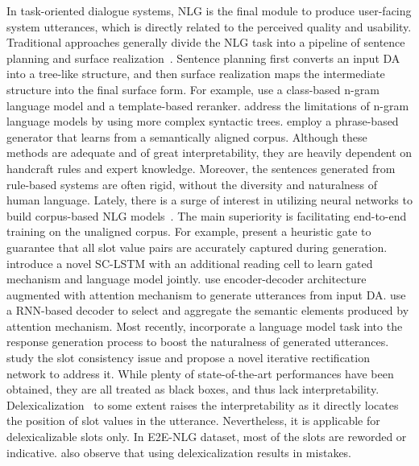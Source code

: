 \documentclass[letterpaper]{article} %
\begin{document}
In task-oriented dialogue systems, NLG is the final module to produce user-facing system utterances, which is directly related to the perceived quality and usability. Traditional approaches generally divide the NLG task into a pipeline of sentence planning and surface realization~\citep{oh2000stochastic,ratnaparkhi2000trainable,mirkovic2011dialogue,cheyer2014method}. Sentence planning first converts an input DA into a tree-like structure, and then surface realization maps the intermediate structure into the final surface form. For example, \citet{oh2000stochastic} use a class-based n-gram language model and a template-based reranker. \citet{ratnaparkhi2000trainable} address the limitations of n-gram language models by using more complex syntactic trees. \citet{mairesse2014stochastic} employ a phrase-based generator that learns from a semantically aligned corpus. Although these methods are adequate and of great interpretability, they are heavily dependent on handcraft rules and expert knowledge. Moreover, the sentences generated from rule-based systems are often rigid, without the diversity and naturalness of human language.  Lately, there is a surge of interest in utilizing neural networks to build corpus-based NLG models~\citep{wen-etal-2015-stochastic,dusek-jurcicek-2016-sequence,tran-nguyen-2017-natural,li-etal-2020-slot}. The main superiority is facilitating end-to-end training on the unaligned corpus. For example, \citet{wen-etal-2015-stochastic} present a heuristic gate to guarantee that all slot value pairs are accurately captured during generation. \citet{wen-etal-2015-semantically} introduce a novel SC-LSTM with an additional reading cell to learn gated mechanism and language model jointly.  \citet{dusek-jurcicek-2016-sequence} use encoder-decoder architecture augmented with attention mechanism to generate utterances from input DA. \citet{tran-nguyen-2017-natural} use a RNN-based decoder to select and aggregate the semantic elements produced by attention mechanism. Most recently, \citet{zhu2019multi}  incorporate a language model task into the response generation process to boost the naturalness of generated utterances. \citet{li-etal-2020-slot} study the slot consistency issue and propose a novel iterative rectification network to address it. While plenty of state-of-the-art performances have been obtained, they are all treated as black boxes, and thus lack interpretability. Delexicalization~\citep{wen-etal-2015-semantically,tran-nguyen-2017-natural,li-etal-2020-handling} to some extent raises the interpretability as it directly locates the position of slot values in the utterance. Nevertheless, it is applicable for delexicalizable slots only. In E2E-NLG dataset, most of the slots are reworded or indicative. \citet{nayak2017plan} also observe that using delexicalization results in mistakes.
\end{document}

